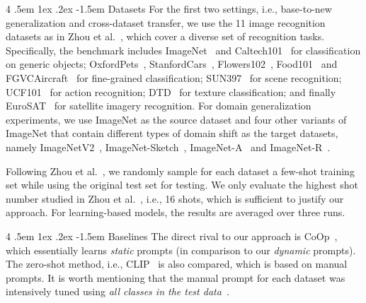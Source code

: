 \documentclass[10pt,twocolumn,letterpaper]{article}
\makeatletter
\renewcommand\paragraph{
  \@startsection{paragraph} {4} {\z@} {.5em \@plus1ex \@minus.2ex} {-1.5em} {\normalfont\normalsize\bfseries} }
\makeatother
\begin{document}
\paragraph{Datasets}
For the first two settings, i.e., base-to-new generalization and cross-dataset transfer, we use the 11 image recognition datasets as in Zhou et al.~\cite{zhou2021coop}, which cover a diverse set of recognition tasks. Specifically, the benchmark includes ImageNet~\cite{deng2009imagenet} and Caltech101~\cite{fei2004learning} for classification on generic objects; OxfordPets~\cite{parkhi2012cats}, StanfordCars~\cite{krause20133d}, Flowers102~\cite{nilsback2008automated}, Food101~\cite{bossard2014food} and FGVCAircraft~\cite{maji2013fine} for fine-grained classification; SUN397~\cite{xiao2010sun} for scene recognition; UCF101~\cite{soomro2012ucf101} for action recognition; DTD~\cite{cimpoi2014describing} for texture classification; and finally EuroSAT~\cite{helber2019eurosat} for satellite imagery recognition. For domain generalization experiments, we use ImageNet as the source dataset and four other variants of ImageNet that contain different types of domain shift as the target datasets, namely ImageNetV2~\cite{recht2019imagenet}, ImageNet-Sketch~\cite{wang2019learning}, ImageNet-A~\cite{hendrycks2021natural} and ImageNet-R~\cite{hendrycks2021many}.


Following Zhou et al.~\cite{zhou2021coop}, we randomly sample for each dataset a few-shot training set while using the original test set for testing. We only evaluate the highest shot number studied in Zhou et al.~\cite{zhou2021coop}, i.e., 16 shots, which is sufficient to justify our approach. For learning-based models, the results are averaged over three runs.

\paragraph{Baselines}
The direct rival to our approach is CoOp~\cite{zhou2021coop}, which essentially learns \emph{static} prompts (in comparison to our \emph{dynamic} prompts). The zero-shot method, i.e., CLIP~\cite{radford2021learning} is also compared, which is based on manual prompts. It is worth mentioning that the manual prompt for each dataset was intensively tuned using \emph{all classes in the test data}~\cite{radford2021learning}.
\end{document}
